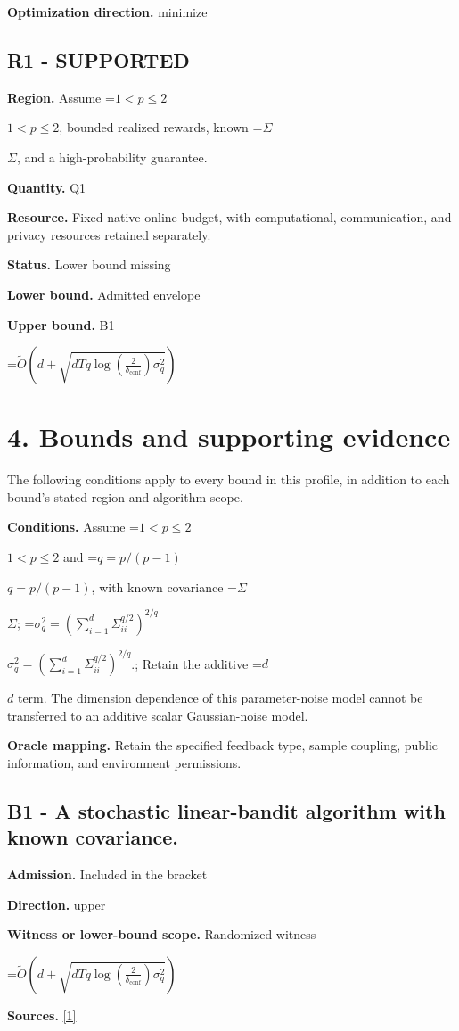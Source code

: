 \documentclass[10pt,a4paper]{article}
\newcommand{\AtlasMath}[1]{\par\begingroup\centering\setbox0=\hbox{$\displaystyle #1$}\ifdim\wd0>1.4\linewidth\typeout{ATLAS WIDE FORMULA: \the\wd0}\fi\ifdim\wd0>\linewidth\resizebox{\linewidth}{!}{\box0}\else\box0\fi\par\endgroup}
\newcommand{\AtlasInlineMath}[1]{\begingroup\setbox0=\hbox{$#1$}\ifdim\wd0>.4\linewidth\endgroup\AtlasMath{#1}\else\endgroup$#1$\fi}
\begin{document}
\textbf{Optimization direction.} minimize

\subsection{R1 - SUPPORTED}
\textbf{Region.} Assume \AtlasInlineMath{1<p\le2}, bounded realized rewards, known \AtlasInlineMath{\Sigma}, and a high-probability guarantee.

\textbf{Quantity.} Q1

\textbf{Resource.} Fixed native online budget, with computational, communication, and privacy resources retained separately.

\textbf{Status.} Lower bound missing

\textbf{Lower bound.} Admitted envelope

\textbf{Upper bound.} B1

\AtlasMath{\widetilde{O}\!\left(d+\sqrt{dTq\log\!\left(\frac2{\delta_{\mathrm{conf}}}\right)\sigma_q^2}\right)}
\section{4. Bounds and supporting evidence}
The following conditions apply to every bound in this profile, in addition to each bound's stated region and algorithm scope.

\textbf{Conditions.} Assume \AtlasInlineMath{1<p\le2} and \AtlasInlineMath{q=p/(p-1)}, with known covariance \AtlasInlineMath{\Sigma}; \AtlasInlineMath{\sigma_q^2=(\sum_{i=1}^d\Sigma_{ii}^{q/2})^{2/q}}.; Retain the additive \AtlasInlineMath{d} term. The dimension dependence of this parameter-noise model cannot be transferred to an additive scalar Gaussian-noise model.

\textbf{Oracle mapping.} Retain the specified feedback type, sample coupling, public information, and environment permissions.

\subsection{B1 - A stochastic linear-bandit algorithm with known covariance.}
\textbf{Admission.} Included in the bracket

\textbf{Direction.} upper

\textbf{Witness or lower-bound scope.} Randomized witness

\AtlasMath{\widetilde{O}\!\left(d+\sqrt{dTq\log\!\left(\frac2{\delta_{\mathrm{conf}}}\right)\sigma_q^2}\right)}
\textbf{Sources.} \href{https://raw.githubusercontent.com/mlresearch/v306/main/assets/ezer26a/ezer26a.pdf}{[1]}
\end{document}
